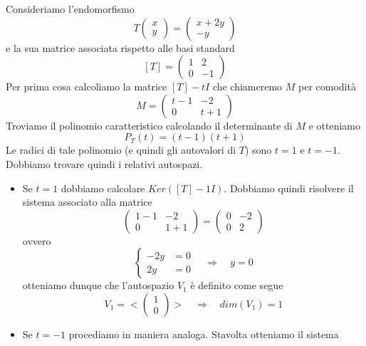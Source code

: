 \begin{example}
	Consideriamo l'endomorfismo
	\[
		T \begin{pmatrix} x \\ y \end{pmatrix} =
		\begin{pmatrix}
			x + 2y \\
			-y
		\end{pmatrix}
	\]
	e la sua matrice associata rispetto alle basi standard
	\[
		[T] = \begin{pmatrix}
			1 & 2  \\
			0 & -1
		\end{pmatrix}
	\]
	Per prima cosa calcoliamo la matrice $[T] - tI$ che chiameremo $M$ per comodit\`a
	\[
		M = \begin{pmatrix}
			t - 1 & -2    \\
			0     & t + 1
		\end{pmatrix}
	\]
	Troviamo il polinomio caratteristico calcolando il determinante di $M$ e otteniamo
	\[
		P_T(t) = (t - 1)(t + 1)
	\]
	Le radici di tale polinomio (e quindi gli autovalori di $T$) sono $t = 1$ e $t = -1$.
	Dobbiamo trovare quindi i relativi autospazi.
	\begin{itemize}
		\item Se $t = 1$ dobbiamo calcolare $Ker([T] - 1I)$. Dobbiamo quindi risolvere il
		      sistema associato alla matrice
		      \[
			      \begin{pmatrix}
				      1 - 1 & -2    \\
				      0     & 1 + 1
			      \end{pmatrix} =
			      \begin{pmatrix}
				      0 & -2 \\
				      0 & 2
			      \end{pmatrix}
		      \]
		      ovvero
		      \[
			      \begin{cases}
				      -2y & = 0 \\
				      2y  & = 0
			      \end{cases} \quad \Rightarrow \quad
			      y = 0
		      \]
		      otteniamo dunque che l'autospazio $V_1$ \`e definito come segue
		      \[
			      V_1 = < \begin{pmatrix} 1 \\ 0 \end{pmatrix} > \quad \Rightarrow \quad
			      dim(V_1) = 1
		      \]
		\item Se $t = -1$ procediamo in maniera analoga. Stavolta otteniamo il sistema

\end{itemize}
\end{example}
